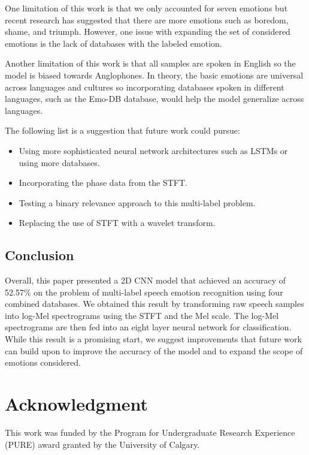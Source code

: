 \documentclass[conference]{IEEEtran}
\begin{document}
One limitation of this work is that we only accounted for seven emotions but recent research has suggested that there are more emotions such as boredom, shame, and triumph. \cite{Cordaro2018} However, one issue with expanding the set of considered emotions is the lack of databases with the labeled emotion.

Another limitation of this work is that all samples are spoken in English so the model is biased towards Anglophones. In theory, the basic emotions are universal across languages and cultures so incorporating databases spoken in different languages, such as the Emo-DB database, would help the model generalize across languages.\cite{Burkhardt2005}

The following list is a suggestion that future work could pursue:
\begin{itemize}
	\item Using more sophisticated neural network architectures such as LSTMs or using more databases.
	\item Incorporating the phase data from the STFT.
	\item Testing a binary relevance approach to this multi-label problem.
	\item Replacing the use of STFT with a wavelet transform.
\end{itemize}

\subsection{Conclusion}

Overall, this paper presented a 2D CNN model that achieved an accuracy of 52.57\% on the problem of multi-label speech emotion recognition using four combined databases. We obtained this result by transforming raw speech samples into log-Mel spectrograms using the STFT and the Mel scale. The log-Mel spectrograms are then fed into an eight layer neural network for classification. While this result is a promising start, we suggest improvements that future work can build upon to improve the accuracy of the model and to expand the scope of emotions considered.

\section*{Acknowledgment}
This work was funded by the Program for Undergraduate Research Experience (PURE) award granted by the University of Calgary.



\end{document}
